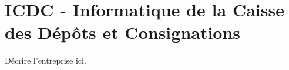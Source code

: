 
\section{ICDC - Informatique de la Caisse des Dépôts et Consignations}

Décrire l'entreprise ici.  
